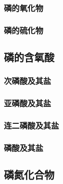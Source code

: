 \documentclass{ctexart}
\begin{document}
\subsubsection{磷的氧化物}
\subsubsection{磷的硫化物}
\subsection{磷的含氧酸}
\subsubsection{次磷酸及其盐}
\subsubsection{亚磷酸及其盐}
\subsubsection{连二磷酸及其盐}
\subsubsection{磷酸及其盐}
\subsection{磷氮化合物}
\end{document}
